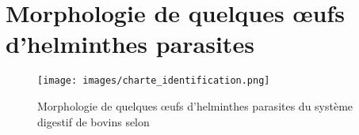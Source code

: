 \chapter{Morphologie de quelques \oe ufs d'helminthes parasites}\label{annex:eggs-guide}

\renewcommand{\thefigure}{B.\arabic{figure}}
\setcounter{figure}{0}

\begin{figure}[!ht]
\begin{center}
	\texttt{[image: images/charte\_identification.png]}
	\caption[Morphologie de quelques \oe ufs d'helminthes parasites du système digestif de bovins]
	{Morphologie de quelques \oe ufs d'helminthes parasites du système digestif de bovins selon  \label{fig:morph-oeuf}}
\end{center}
\end{figure}
